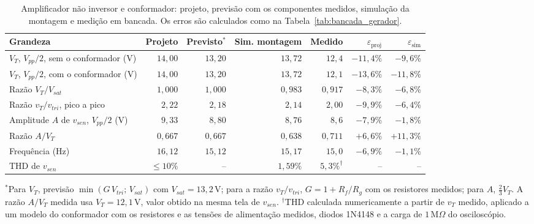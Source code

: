 \documentclass[11pt,a4paper]{article}
\begin{document}
\begin{table}[H]
\centering
\caption{Amplificador não inversor e conformador: projeto, previsão com os componentes medidos, simulação da montagem e medição em bancada. Os erros são calculados como na Tabela~\ref{tab:bancada_gerador}.}
\label{tab:bancada_conformador}
\small
\setlength{\tabcolsep}{5pt}
\begin{tabular}{@{}lrrrrrr@{}}
\toprule
\textbf{Grandeza} & \textbf{Projeto} & \textbf{Previsto}$^{\ast}$ & \textbf{Sim. montagem} & \textbf{Medido} & $\varepsilon_{\text{proj}}$ & $\varepsilon_{\text{sim}}$ \\
\midrule
$V_T$, $V_{pp}/2$, sem o conformador (V) & $14{,}00$ & $13{,}20$ & $13{,}72$ & $12{,}4$ & $-11{,}4\%$ & $-9{,}6\%$ \\
$V_T$, $V_{pp}/2$, com o conformador (V) & $14{,}00$ & $13{,}20$ & $13{,}72$ & $12{,}1$ & $-13{,}6\%$ & $-11{,}8\%$ \\
Razão $V_T/V_{sat}$ & $1{,}000$ & $1{,}000$ & $0{,}983$ & $0{,}917$ & $-8{,}3\%$ & $-6{,}8\%$ \\
Razão $v_T/v_{tri}$, pico a pico & $2{,}22$ & $2{,}18$ & $2{,}14$ & $2{,}00$ & $-9{,}9\%$ & $-6{,}4\%$ \\
Amplitude $A$ de $v_{sen}$, $V_{pp}/2$ (V) & $9{,}33$ & $8{,}80$ & $8{,}76$ & $8{,}6$ & $-7{,}9\%$ & $-1{,}8\%$ \\
Razão $A/V_T$ & $0{,}667$ & $0{,}667$ & $0{,}638$ & $0{,}711$ & $+6{,}6\%$ & $+11{,}3\%$ \\
Frequência (Hz) & $16{,}12$ & $15{,}12$ & $15{,}17$ & $15{,}0$ & $-6{,}9\%$ & $-1{,}1\%$ \\
THD de $v_{sen}$ & $\le 10\%$ & -- & $1{,}59\%$ & $5{,}3\%^{\dagger}$ & -- & -- \\
\bottomrule
\end{tabular}

\vspace{4pt}
\begin{minipage}{0.95\linewidth}
\footnotesize $^{\ast}$Para $V_T$, previsão $\min(G\,V_{tri};\,V_{sat})$ com $V_{sat} = 13{,}2\,\text{V}$; para a razão $v_T/v_{tri}$, $G = 1 + R_f/R_g$ com os resistores medidos; para $A$, $\tfrac{2}{3}V_T$. A razão $A/V_T$ medida usa $V_T = 12{,}1\,\text{V}$, valor obtido na mesma tela de $v_{sen}$. $^{\dagger}$THD calculada numericamente a partir de $v_T$ medido, aplicado a um modelo do conformador com os resistores e as tensões de alimentação medidos, diodos 1N4148 e a carga de $1\,\text{M}\Omega$ do osciloscópio.
\end{minipage}
\end{table}
\end{document}
